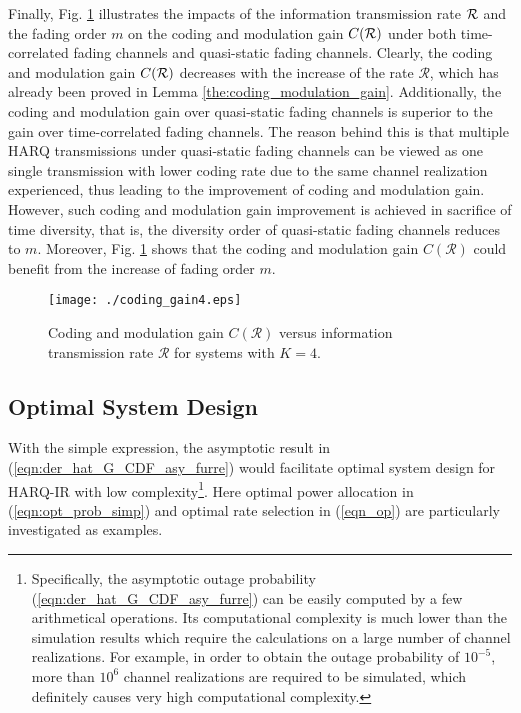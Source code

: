 \documentclass[12pt,onecolumn,draftcls]{IEEEtran}
\begin{document}
Finally, Fig. \ref{fig:coding_gain} illustrates the impacts of the information transmission rate $\cal R$ and the fading order $m$ on the coding and modulation gain $C(\cal R)$ under both time-correlated fading channels and quasi-static fading channels. Clearly, the coding and modulation gain $C(\cal R)$ decreases with the increase of the rate $\mathcal R$, which has already been proved in Lemma \ref{the:coding_modulation_gain}. Additionally, the coding and modulation gain over quasi-static fading channels is superior to the gain over time-correlated fading channels. The reason behind this is that multiple HARQ transmissions under quasi-static fading channels can be viewed as one single transmission with lower coding rate due to the same channel realization experienced, thus leading to the improvement of coding and modulation gain. However, such coding and modulation gain improvement is achieved in sacrifice of time diversity, that is, the diversity order of quasi-static fading channels reduces to $m$. Moreover, Fig. \ref{fig:coding_gain} shows that the coding and modulation gain $C(\mathcal R)$ could benefit from the increase of fading order $m$. %
\begin{figure}
  \centering
  \texttt{[image: ./coding\_gain4.eps]}\\
  \caption{Coding and modulation gain $C(\mathcal R)$ versus information transmission rate $\mathcal R$ for systems with $K=4$.}\label{fig:coding_gain}
\end{figure}
\subsection{Optimal System Design}
With the simple expression, the asymptotic result in (\ref{eqn:der_hat_G_CDF_asy_furre}) would facilitate optimal system design for HARQ-IR with low complexity\footnote{Specifically, the asymptotic outage probability (\ref{eqn:der_hat_G_CDF_asy_furre}) can be easily computed by a few arithmetical operations. Its computational complexity is much lower than the simulation results which require the calculations on a large number of channel realizations. For example, in order to obtain the outage probability of $10^{-5}$, more than $10^6$ channel realizations are required to be simulated, which definitely causes very high computational complexity.}. Here optimal power allocation in (\ref{eqn:opt_prob_simp}) and optimal rate selection in (\ref{eqn_op}) are particularly investigated as examples.
\end{document}
